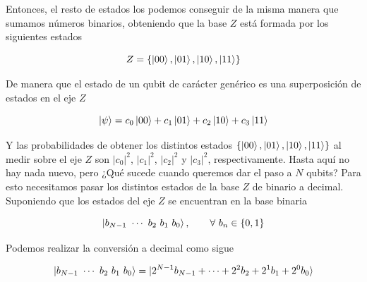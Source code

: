 \documentclass[12pt]{article}
\numberwithin{equation}{section} %
\begin{document}
    \vspace{2.5mm}

    Entonces, el resto de estados los podemos conseguir de la misma manera que sumamos números binarios, obteniendo que la base \( Z \) está formada por los siguientes estados

    \begin{equation*}
        Z = \{ \ket{0 0}, \ket{0 1}, \ket{1 0}, \ket{1 1} \}
    \end{equation*}

    \vspace{2.5mm}

    De manera que el estado de un qubit de carácter genérico es una superposición de estados en el eje \( Z \)

    \begin{equation}
        \ket{\psi} = c_{0} \ket{0 0} + c_{1} \ket{0 1} + c_{2} \ket{1 0} + c_{3} \ket{1 1}
        \label{eq: superposicion_qubit_2_estados}
    \end{equation}

    \vspace{2.5mm}

    Y las probabilidades de obtener los distintos estados \( \{ \ket{0 0}, \ket{0 1}, \ket{1 0}, \ket{1 1} \} \) al medir sobre el eje \( Z \) son \( | c_{0} |^{2} \), \( | c_{1} |^{2} \), \( | c_{2} |^{2} \) y \( | c_{3} |^{2} \), respectivamente. Hasta aquí no hay nada nuevo, pero ¿Qué sucede cuando queremos dar el paso a \( N \) qubits? Para esto necesitamos pasar los distintos estados de la base \( Z \) de binario a decimal. Suponiendo que los estados del eje \( Z \) se encuentran en la base binaria

    \begin{equation*}
        \ket{b_{N - 1} \ \cdots \ b_{2} \ b_{1} \ b_{0}}, \qquad \forall \ b_{n} \in \{0, 1\}
    \end{equation*}

    \vspace{2.5mm}

    Podemos realizar la conversión a decimal como sigue
    
    \begin{equation}
        \ket{b_{N - 1} \ \cdots \ b_{2} \ b_{1} \ b_{0}} = \ket{ 2^{N - 1} b_{N - 1} + \cdots + 2^{2} b_{2} + 2^{1} b_{1} + 2^{0} b_{0} }
        \label{eq: conversion_qubits_binario_decimal}
    \end{equation}

    \vspace{2.5mm}
\end{document}
